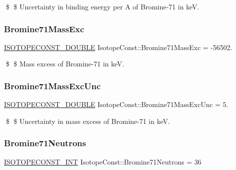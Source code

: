 \$ \$ Uncertainty in binding energy per A of Bromine-\/71 in keV. \mbox{\label{group___isotope_const-_bromine-_br71_gac96237d7efaa1749de4bdc1b5ffb9a9c}} 
\subsubsection{\texorpdfstring{Bromine71\+Mass\+Exc}{Bromine71MassExc}}
{\footnotesize\ttfamily \mbox{\hyperlink{group___isotope_const-_macros_ga8f45a7272ce02c0b4c65c44636ed719a}{I\+S\+O\+T\+O\+P\+E\+C\+O\+N\+S\+T\+\_\+\+D\+O\+U\+B\+LE}} Isotope\+Const\+::\+Bromine71\+Mass\+Exc = -\/56502.}

\$ \$ Mass excess of Bromine-\/71 in keV. \mbox{\label{group___isotope_const-_bromine-_br71_ga8b12d6bac961bb6f83311fec327fb997}} 
\subsubsection{\texorpdfstring{Bromine71\+Mass\+Exc\+Unc}{Bromine71MassExcUnc}}
{\footnotesize\ttfamily \mbox{\hyperlink{group___isotope_const-_macros_ga8f45a7272ce02c0b4c65c44636ed719a}{I\+S\+O\+T\+O\+P\+E\+C\+O\+N\+S\+T\+\_\+\+D\+O\+U\+B\+LE}} Isotope\+Const\+::\+Bromine71\+Mass\+Exc\+Unc = 5.}

\$ \$ Uncertainty in mass excess of Bromine-\/71 in keV. \mbox{\label{group___isotope_const-_bromine-_br71_ga7fe19bbff94c9df0dd7166c6f50f1364}} 
\subsubsection{\texorpdfstring{Bromine71\+Neutrons}{Bromine71Neutrons}}
{\footnotesize\ttfamily \mbox{\hyperlink{group___isotope_const-_macros_ga5f18360b3e99483a35c32d789e62621c}{I\+S\+O\+T\+O\+P\+E\+C\+O\+N\+S\+T\+\_\+\+I\+NT}} Isotope\+Const\+::\+Bromine71\+Neutrons = 36}

